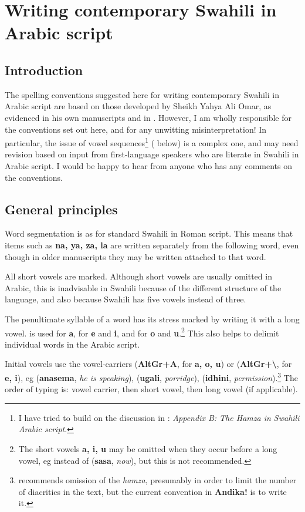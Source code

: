 \chapter{Writing contemporary Swahili in Arabic script}
\label{ch:spelling}

\section{Introduction}

The spelling conventions suggested here for writing contemporary Swahili in Arabic script are based on those developed by Sheikh Yahya Ali Omar, as evidenced in his own manuscripts and in \citet{Omar1997}.  However, I am wholly responsible for the conventions set out here, and for any unwitting misinterpretation!  In particular, the issue of vowel sequences\footnote{I have tried to build on the discussion in \citet{Omar1997}: \textit{Appendix B: The Hamza in Swahili Arabic script}.} ( below) is a complex one, and may need revision based on input from first-language speakers who are literate in Swahili in Arabic script. I would be happy to hear from anyone who has any comments on the conventions.

\section{General principles}

Word segmentation is as for standard Swahili in Roman script. This means that items such as  \textbf{na, ya, za, la} are written separately from the following word, even though in older manuscripts they may be written attached to that word.

All short vowels are marked. Although short vowels are usually omitted in Arabic, this is inadvisable in Swahili because of the different structure of the language, and also because Swahili has five vowels instead of three.

The penultimate syllable of a word has its stress marked by writing it with a long vowel.  is used for \textbf{a},  for \textbf{e} and \textbf{i}, and  for \textbf{o} and \textbf{u}.\footnote{The short vowels \textbf{a, i, u} may be omitted when they occur before a long vowel, eg  instead of  (\textbf{sasa}, \textit{now}), but this is not recommended.} This also helps to delimit individual words in the Arabic script.

Initial vowels use the vowel-carriers  (\textbf{AltGr+A}, for \textbf{a, o, u}) or  (\textbf{AltGr+\textbackslash}, for \textbf{e, i}), eg  (\textbf{anasema}, \textit{he is speaking}),  (\textbf{ugali}, \textit{porridge}),  (\textbf{idhini}, \textit{permission}).\footnote{\citet[p69]{Omar1997} recommends omission of the \textit{hamza}, presumably in order to limit the number of diacritics in the text, but the current convention in \textbf{Andika!} is to write it.} The order of typing is: vowel carrier, then short vowel, then long vowel (if applicable).

